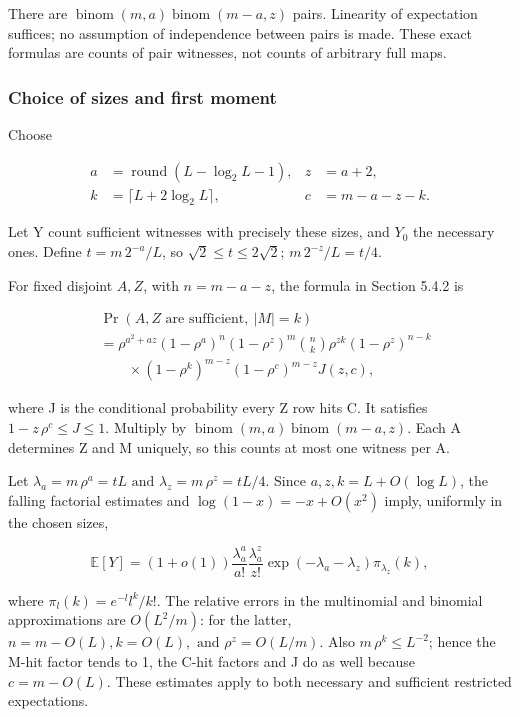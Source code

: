 \documentclass[11pt]{article}
\begin{document}
There are $\operatorname{binom}(m,a)\operatorname{binom}(m-a,z)$ pairs. Linearity of expectation suffices; no assumption of independence between pairs is made. These exact formulas are counts of pair witnesses, not counts of arbitrary full maps.

\subsubsection{Choice of sizes and first moment}

Choose

\[
\begin{aligned}a&=\operatorname{round}(L-\log_2 L-1),&z&=a+2,\\
k&=\lceil L+2\log_2 L\rceil,&c&=m-a-z-k.\end{aligned}
\]

Let Y count sufficient witnesses with precisely these sizes, and $Y_{0}$ the necessary ones. Define $t=m\,2^{-a}/L$, so $\sqrt{2}\leq t\leq 2\sqrt{2}$; $m\,2^{-z}/L=t/4$.

For fixed disjoint $A,Z$, with $n=m-a-z$, the formula in Section 5.4.2 is

\[
\begin{aligned}
&\Pr(A,Z\text{ are sufficient},\ |M|=k)\\
&=\rho^{a^2+az}(1-\rho^a)^n(1-\rho^z)^m
\binom nk\rho^{zk}(1-\rho^z)^{n-k}\\
&\qquad{}\times(1-\rho^k)^{m-z}(1-\rho^c)^{m-z}J(z,c),
\end{aligned}
\]

where J is the conditional probability every Z row hits C. It satisfies $1-z\,\rho ^{c}\leq J\leq 1$. Multiply by $\operatorname{binom}(m,a)\operatorname{binom}(m-a,z)$. Each A determines Z and M uniquely, so this counts at most one witness per A.

Let $\lambda _{a}=m\,\rho ^{a}=t L \text{ and } \lambda _{z}=m\,\rho ^{z}=t L/4$. Since $a,z,k=L+O(\log  L)$, the falling factorial estimates and $\log (1-x)=-x+O(x^{2})$ imply, uniformly in the chosen sizes,

\[
\mathbb E[Y]=(1+o(1))\frac{\lambda_a^a}{a!}\frac{\lambda_a^z}{z!}
\exp(-\lambda_a-\lambda_z)\pi_{\lambda_z}(k),
\]

where $\pi_l(k)=e^{-l}l^k/k!$. The relative errors in the multinomial and binomial approximations are $O(L^{2}/m)$: for the latter, $n=m-O(L), k=O(L), \text{ and } \rho ^{z}=O(L/m)$. Also $m\,\rho ^{k}\leq L^{-2}$; hence the M-hit factor tends to 1, the C-hit factors and J do as well because $c=m-O(L)$. These estimates apply to both necessary and sufficient restricted expectations.
\end{document}
